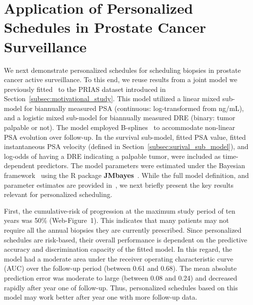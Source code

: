 \section{Application of Personalized Schedules in Prostate Cancer Surveillance}
\label{sec:results}
We next demonstrate personalized schedules for scheduling biopsies in prostate cancer active surveillance. To this end, we reuse results from a joint model we previously fitted~\citep{tomer2019personalized} to the PRIAS dataset introduced in Section~\ref{subsec:motivational_study}. This model utilized a linear mixed sub-model for biannually measured PSA (continuous: log-transformed from ng/mL), and a logistic mixed sub-model for biannually measured DRE (binary: tumor palpable or not). The model employed B-splines~\citep{de1978practical} to accommodate non-linear PSA evolution over follow-up. In the survival sub-model, fitted PSA value, fitted instantaneous PSA velocity (defined in Section~\ref{subsec:surival_sub_model}), and log-odds of having a DRE indicating a palpable tumor, were included as time-dependent predictors. The model parameters were estimated under the Bayesian framework~\citep{tomer2019personalized} using the R package \textbf{JMbayes}~\citep{rizopoulosJMbayes}. While the full model definition, and parameter estimates are provided in~\citet{tomer2019personalized}, we next briefly present the key results relevant for personalized scheduling.

First, the cumulative-risk of progression at the maximum study period of ten years was 50\% (Web-Figure~1). This indicates that many patients may not require all the annual biopsies they are currently prescribed. Since personalized schedules are risk-based, their overall performance is dependent on the predictive accuracy and discrimination capacity of the fitted model. In this regard, the model had a moderate area under the receiver operating characteristic curve (AUC) over the follow-up period (between 0.61 and 0.68). The mean absolute prediction error was moderate to large (between 0.08 and 0.24) and decreased rapidly after year one of follow-up. Thus, personalized schedules based on this model may work better after year one with more follow-up data.

